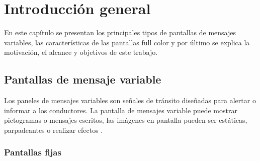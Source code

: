 
\chapter{Introducción general} %

\label{Chapter1} %
\label{IntroGeneral}
En este capítulo se presentan los principales tipos de pantallas de mensajes variables, las características de las pantallas full color y por último se explica la motivación, el alcance y objetivos de este trabajo.

\newcommand{\keyword}[1]{\textbf{#1}}
\newcommand{\tabhead}[1]{\textbf{#1}}
\newcommand{\code}[1]{\texttt{#1}}
\newcommand{\file}[1]{\texttt{\bfseries#1}}
\newcommand{\option}[1]{\texttt{\itshape#1}}
\newcommand{\grados}{$^{\circ}$}



\section{Pantallas de mensaje variable}

Los paneles de mensajes variables son señales de tránsito diseñadas para alertar o informar a los conductores. La pantalla de mensajes variable puede mostrar pictogramas o mensajes escritos, las imágenes en pantalla pueden ser estáticas, parpadeantes o realizar efectos \cite{WIKIVMS}.

\subsection{Pantallas fijas}

